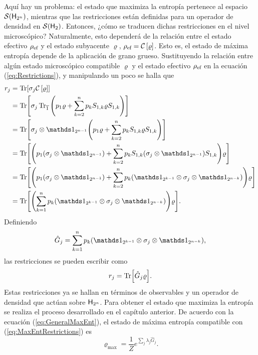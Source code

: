 Aquí hay un problema: el estado que maximiza la entropía pertenece al espacio $\mathcal{S}({\sf H}_{2^{n}})$, mientras que las restricciones están definidas para un operador de densidad en $\mathcal{S}({\sf H}_{2})$. Entonces, ¿cómo se traducen dichas restricciones en el nivel microscópico? Naturalmente, esto dependerá de la relación entre el estado efectivo $\rho_{\text{ef}}$ y el estado subyacente $\varrho$, $\rho_{\text{ef}}=\mathcal{C}\left[\varrho\right]$. Esto es, el estado de máxima entropía depende de la aplicación de grano grueso. Sustituyendo la relación entre algún estado microscópico compatible $\varrho$ y el estado efectivo $\rho_{\text{ef}}$ en la ecuación (\ref{eq:Restrictions}), y manipulando un poco se halla que
\begin{align}
    r_{j}&=\Tr[\sigma_{j}\CG{\varrho}]\nonumber\\
    &=\Tr[\sigma_{j}\Tr_{\overline{1}}\qty(p_{1}\varrho+\sum_{k=2}^{n}p_{k}S_{1,k}\varrho S_{1,k})]\nonumber\\
    &=\Tr[\sigma_{j}\otimes\Id_{2^{n-1}}\qty(p_{1}\varrho+\sum_{k=2}^{n}p_{k}S_{1,k}\varrho S_{1,k})]\nonumber\\
    &=\Tr[\qty(p_{1}(\sigma_{j}\otimes\Id_{2^{n-1}})+\sum_{k=2}^{n}p_{k}S_{1,k}(\sigma_{j}\otimes\Id_{2^{n-1}})S_{1,k})\varrho]\nonumber\\
    &=\Tr[\qty(p_{1}(\sigma_{j}\otimes\Id_{2^{n-1}})+\sum_{k=2}^{n}p_{k}(\Id_{2^{k-1}}\otimes\sigma_{j}\otimes\Id_{2^{n-k}}))\varrho]\nonumber\\
    &=\Tr[\qty(\sum_{k=1}^{n}p_{k}(\Id_{2^{k-1}}\otimes\sigma_{j}\otimes\Id_{2^{n-k}}))\varrho]\nonumber.
\end{align}
Definiendo
\begin{equation}\label{eq:GhatNM}
    \hat{G}_{j}=\sum_{k=1}^{n}p_{k}(\Id_{2^{k-1}}\otimes\sigma_{j}\otimes\Id_{2^{n-k}}),
\end{equation}
las restricciones se pueden escribir como
\begin{equation}\label{eq:MaxEntRestrictions}
    r_{j}=\Tr[\hat{G}_{j}\varrho].
\end{equation}
Estas restricciones ya se hallan en términos de observables y un operador de densidad que actúan sobre ${\sf H}_{2^{n}}$. Para obtener el estado que maximiza la entropía se realiza el proceso desarrollado en el capítulo anterior. De acuerdo con la ecuación (\ref{eq:GeneralMaxEnt}), el estado de máxima entropía compatible con (\ref{eq:MaxEntRestrictions}) es
\begin{equation}\label{eq:MaxEntLagMult}
    \varrho_{\max}=\frac{1}{Z}e^{\sum_{j}\lambda_{j}\hat{G}_{j}}.
\end{equation}
